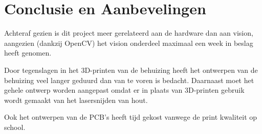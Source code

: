 \chapter{Conclusie en Aanbevelingen}
\label{ch:conclusion}

Achteraf gezien is dit project meer gerelateerd aan de hardware dan aan vision,
aangezien (dankzij OpenCV) het vision onderdeel maximaal een week in beslag
heeft genomen.

Door tegenslagen in het 3D-printen van de behuizing heeft het ontwerpen van de
behuizing veel langer geduurd dan van te voren is bedacht. Daarnaast moet het
gehele ontwerp worden aangepast omdat er in plaats van 3D-printen gebruik wordt
gemaakt van het lasersnijden van hout.

Ook het ontwerpen van de PCB's heeft tijd gekost vanwege de print kwaliteit op
school.
